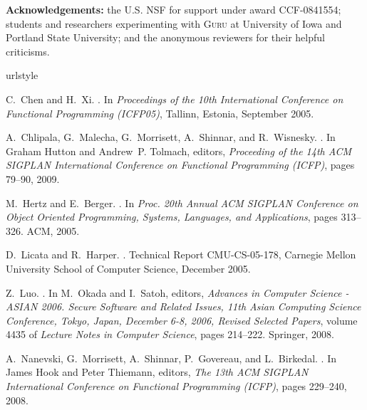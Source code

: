 \documentclass[9pt,natbib]{sigplanconf}
\begin{document}
\textbf{Acknowledgements:} the U.S. NSF for support under award
CCF-0841554; students and researchers experimenting with \textsc{Guru}
at University of Iowa and Portland State University; and the anonymous
reviewers for their helpful criticisms.

\begin{thebibliography}{18}
\providecommand{\natexlab}[1]{#1}
\providecommand{\url}[1]{\texttt{#1}}
\expandafter\ifx\csname urlstyle\endcsname\relax
  \providecommand{\doi}[1]{doi: #1}\else
  \providecommand{\doi}{doi: \begingroup \urlstyle{rm}\Url}\fi

C.~Chen and H.~Xi.
.
\newblock In \emph{Proceedings of the 10th International Conference on
  Functional Programming (ICFP05)}, Tallinn, Estonia, September 2005.

A.~Chlipala, G.~Malecha, G.~Morrisett, A.~Shinnar, and R.~Wisnesky.
.
\newblock In Graham Hutton and Andrew~P. Tolmach, editors, \emph{Proceeding of
  the 14th ACM SIGPLAN International Conference on Functional Programming
  (ICFP)}, pages 79--90, 2009.

M.~Hertz and E.~Berger.
.
\newblock In \emph{Proc. 20th Annual ACM SIGPLAN Conference on Object Oriented
  Programming, Systems, Languages, and Applications}, pages 313--326. ACM,
  2005.

D.~Licata and R.~Harper.
.
\newblock Technical Report CMU-CS-05-178, {Carnegie Mellon University School of
  Computer Science}, December 2005.

Z.~Luo.
.
\newblock In M.~Okada and I.~Satoh, editors, \emph{Advances in Computer Science
  - ASIAN 2006. Secure Software and Related Issues, 11th Asian Computing
  Science Conference, Tokyo, Japan, December 6-8, 2006, Revised Selected
  Papers}, volume 4435 of \emph{Lecture Notes in Computer Science}, pages
  214--222. Springer, 2008.

A.~Nanevski, G.~Morrisett, A.~Shinnar, P.~Govereau, and L.~Birkedal.
.
\newblock In James Hook and Peter Thiemann, editors, \emph{The 13th ACM SIGPLAN
  International Conference on Functional Programming (ICFP)}, pages 229--240,
  2008.


\end{thebibliography}
\end{document}
